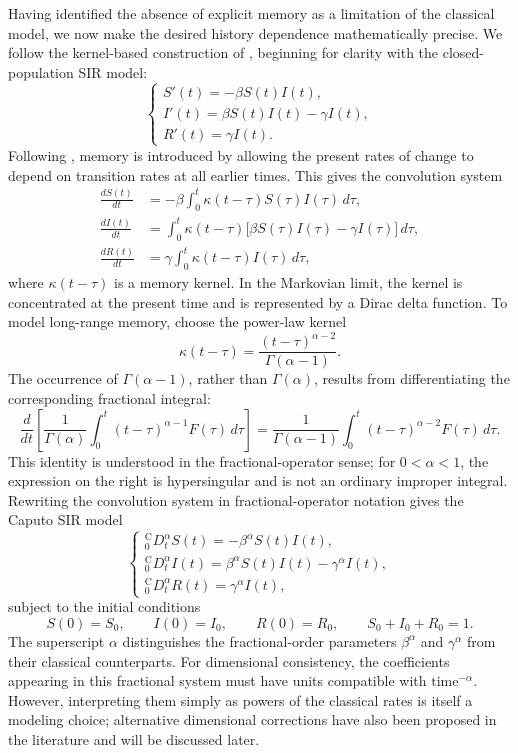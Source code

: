 \documentclass[00-main.tex]{subfiles}
\begin{document}
Having identified the absence of explicit memory as a limitation of the classical model, we now make the desired history dependence mathematically precise.
We follow the kernel-based construction of \cite{Sa17}, beginning for clarity with the closed-population SIR model:
\[
\begin{cases}
    S'(t)=-\beta S(t)I(t), \\
    I'(t)=\beta S(t)I(t)-\gamma I(t), \\
    R'(t)=\gamma I(t).
\end{cases}
\]
Following \cite{Sa17}, memory is introduced by allowing the present rates of change to depend on transition rates at all earlier times.
This gives the convolution system
\[
\begin{aligned}
    \frac{dS(t)}{dt}
        &=-\beta\int_0^t
          \kappa(t-\tau)S(\tau)I(\tau)\,d\tau, \\
    \frac{dI(t)}{dt}
        &=\int_0^t\kappa(t-\tau)
          \bigl[\beta S(\tau)I(\tau)
          -\gamma I(\tau)\bigr]\,d\tau, \\
    \frac{dR(t)}{dt}
        &=\gamma\int_0^t
          \kappa(t-\tau)I(\tau)\,d\tau,
\end{aligned}
\]
where $\kappa(t-\tau)$ is a memory kernel.
In the Markovian limit, the kernel is concentrated at the present time and is represented by a Dirac delta function.
To model long-range memory, \cite{Sa17} choose the power-law kernel
\[
    \kappa(t-\tau)
    =\frac{(t-\tau)^{\alpha-2}}{\Gamma(\alpha-1)}.
\]
The occurrence of $\Gamma(\alpha-1)$, rather than $\Gamma(\alpha)$, results from differentiating the corresponding fractional integral:
\[
    \frac{d}{dt}
    \left[
        \frac{1}{\Gamma(\alpha)}
        \int_0^t(t-\tau)^{\alpha-1}F(\tau)\,d\tau
    \right]
    =
    \frac{1}{\Gamma(\alpha-1)}
    \int_0^t(t-\tau)^{\alpha-2}F(\tau)\,d\tau.
\]
This identity is understood in the fractional-operator sense; for $0<\alpha<1$, the expression on the right is hypersingular and is not an ordinary improper integral. Rewriting the convolution system in fractional-operator notation gives the Caputo SIR model
\[
\begin{cases}
    {}_{0}^{\mathrm{C}}\!D_t^\alpha S(t)
        =-\beta^\alpha S(t)I(t), \\
    {}_{0}^{\mathrm{C}}\!D_t^\alpha I(t)
        =\beta^\alpha S(t)I(t)-\gamma^\alpha I(t), \\
    {}_{0}^{\mathrm{C}}\!D_t^\alpha R(t)
        =\gamma^\alpha I(t),
\end{cases}
\]
subject to the initial conditions
\[
    S(0)=S_0, \qquad I(0)=I_0, \qquad R(0)=R_0,
    \qquad S_0+I_0+R_0=1.
\]
The superscript $\alpha$ distinguishes the fractional-order parameters $\beta^\alpha$ and $\gamma^\alpha$ from their classical counterparts.
For dimensional consistency, the coefficients appearing in this fractional system must have units compatible with $\mathrm{time}^{-\alpha}$.
However, interpreting them simply as powers of the classical rates is itself a modeling choice; alternative dimensional corrections have also been proposed in the literature and will be discussed later.
\end{document}
